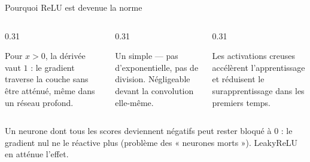 \begin{frame}{Pourquoi ReLU est devenue la norme}
\begin{columns}[t]
\begin{column}{0.31\textwidth}
\begin{ebox}
Pour $x>0$, la dérivée vaut $1$ : le gradient traverse la couche sans être
atténué, même dans un réseau profond.
\end{ebox}
\end{column}
\begin{column}{0.31\textwidth}
\begin{ebox}
Un simple  --- pas d'exponentielle, pas de division. Négligeable
devant la convolution elle-même.
\end{ebox}
\end{column}
\begin{column}{0.31\textwidth}
\begin{ebox}[Convergence]
Les activations creuses accélèrent l'apprentissage et réduisent le
surapprentissage dans les premiers temps.
\end{ebox}
\end{column}
\end{columns}
\vspace{1mm}
\begin{wbox}
Un neurone dont tous les scores deviennent négatifs peut rester bloqué à
$0$ : le gradient nul ne le réactive plus (problème des « neurones morts »).
LeakyReLU en atténue l'effet.
\end{wbox}
\end{frame}
